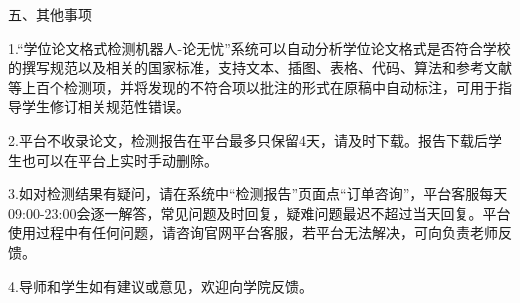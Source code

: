\documentclass[
]{article}
\begin{document}
五、其他事项

1.``学位论文格式检测机器人-论无忧''系统可以自动分析学位论文格式是否符合学校的撰写规范以及相关的国家标准，支持文本、插图、表格、代码、算法和参考文献等上百个检测项，并将发现的不符合项以批注的形式在原稿中自动标注，可用于指导学生修订相关规范性错误。

2.平台不收录论文，检测报告在平台最多只保留4天，请及时下载。报告下载后学生也可以在平台上实时手动删除。

3.如对检测结果有疑问，请在系统中``检测报告''页面点``订单咨询''，平台客服每天09:00-23:00会逐一解答，常见问题及时回复，疑难问题最迟不超过当天回复。平台使用过程中有任何问题，请咨询官网平台客服，若平台无法解决，可向负责老师反馈。

4.导师和学生如有建议或意见，欢迎向学院反馈。
\end{document}
